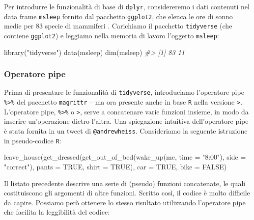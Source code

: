 \documentclass[
]{memoir}
\newenvironment{Shaded}{\begin{snugshade}}{\end{snugshade}}
\newcommand{\AttributeTok}[1]{\textcolor[rgb]{0.77,0.63,0.00}{#1}}
\newcommand{\CommentTok}[1]{\textcolor[rgb]{0.56,0.35,0.01}{\textit{#1}}}
\newcommand{\ConstantTok}[1]{\textcolor[rgb]{0.00,0.00,0.00}{#1}}
\newcommand{\FunctionTok}[1]{\textcolor[rgb]{0.00,0.00,0.00}{#1}}
\newcommand{\NormalTok}[1]{#1}
\newcommand{\StringTok}[1]{\textcolor[rgb]{0.31,0.60,0.02}{#1}}
\theoremstyle{definition}
\theoremstyle{definition}
\theoremstyle{definition}
\theoremstyle{definition}
\theoremstyle{remark}
\begin{document}
Per introdurre le funzionalità di base di \texttt{dplyr}, considereremo i dati contenuti nel data frame \texttt{msleep} fornito dal pacchetto \texttt{ggplot2}, che elenca le ore di sonno medie per 83 specie di mammiferi \citep{savage2007scaling}. Carichiamo il pacchetto \texttt{tidyverse} (che contiene \texttt{ggplot2}) e leggiamo nella memoria di lavoro l'oggetto \texttt{msleep}:

\begin{Shaded}
\begin{Highlighting}[]
\FunctionTok{library}\NormalTok{(}\StringTok{"tidyverse"}\NormalTok{)}
\FunctionTok{data}\NormalTok{(msleep)}
\FunctionTok{dim}\NormalTok{(msleep)}
\CommentTok{\#\textgreater{} [1] 83 11}
\end{Highlighting}
\end{Shaded}

\hypertarget{operatore-pipe}{%
\subsubsection{Operatore pipe}\label{operatore-pipe}}

Prima di presentare le funzionalità di \texttt{tidyverse}, introduciamo l'operatore pipe \texttt{\%\textgreater{}\%} del pacchetto \texttt{magrittr} -- ma ora presente anche in base \texttt{R} nella versione \texttt{\textbar{}\textgreater{}}. L'operatore pipe, \texttt{\%\textgreater{}\%} o \texttt{\textbar{}\textgreater{}}, serve a concatenare varie funzioni insieme, in modo da inserire un'operazione dietro l'altra. Una spiegazione intuitiva dell'operatore pipe è stata fornita in un tweet di \texttt{@andrewheiss}. Consideriamo la seguente istruzione in pseudo-codice \texttt{R}:

\begin{Shaded}
\begin{Highlighting}[]
\FunctionTok{leave\_house}\NormalTok{(}\FunctionTok{get\_dressed}\NormalTok{(}\FunctionTok{get\_out\_of\_bed}\NormalTok{(}\FunctionTok{wake\_up}\NormalTok{(me, }\AttributeTok{time =} \StringTok{"8:00"}\NormalTok{), }\AttributeTok{side =} \StringTok{"correct"}\NormalTok{), }\AttributeTok{pants =} \ConstantTok{TRUE}\NormalTok{, }\AttributeTok{shirt =} \ConstantTok{TRUE}\NormalTok{), }\AttributeTok{car =} \ConstantTok{TRUE}\NormalTok{, }\AttributeTok{bike =} \ConstantTok{FALSE}\NormalTok{)}
\end{Highlighting}
\end{Shaded}

Il listato precedente descrive una serie di (pseudo) funzioni concatenate, le quali costituiscono gli argomenti di altre funzioni. Scritto così, il codice è molto difficile da capire. Possiamo però ottenere lo stesso risultato utilizzando l'operatore pipe che facilita la leggibilità del codice:
\end{document}
